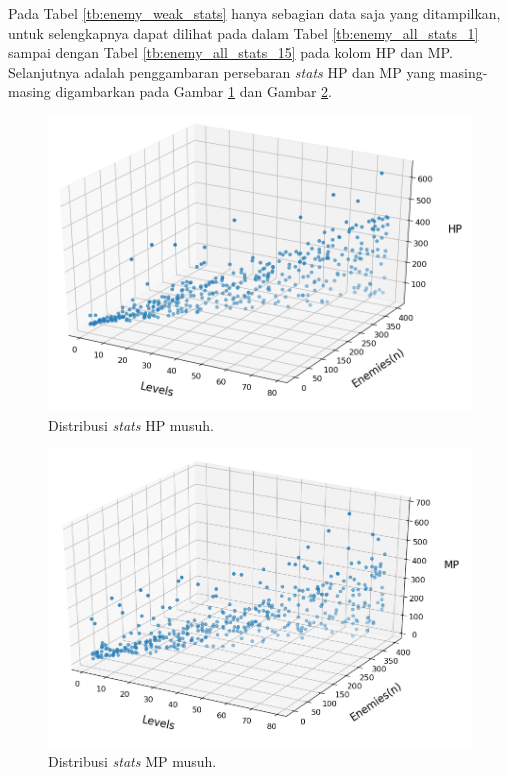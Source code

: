 Pada Tabel \ref{tb:enemy_weak_stats} hanya sebagian data saja yang ditampilkan, untuk selengkapnya dapat dilihat pada  dalam Tabel \ref{tb:enemy_all_stats_1} sampai dengan Tabel \ref{tb:enemy_all_stats_15} pada kolom HP dan MP. Selanjutnya adalah penggambaran persebaran \textit{stats} HP dan MP yang masing-masing digambarkan pada Gambar \ref{fig:enemy_hp_distrib} dan Gambar \ref{fig:enemy_mp_distrib}.
\vspace{1ex}

\begin{figure} [!h] \centering
	\centering
	\includegraphics[scale=0.57]{img/EnemyHpDistrib.png}
	\caption{Distribusi \textit{stats} HP musuh.}
	\label{fig:enemy_hp_distrib}
\end{figure}

\begin{figure} [!h] \centering
	\centering
	\includegraphics[scale=0.57]{img/EnemyMpDistrib.png}
	\caption{Distribusi \textit{stats} MP musuh.}
	\label{fig:enemy_mp_distrib}
\end{figure}
\vspace{1ex}

